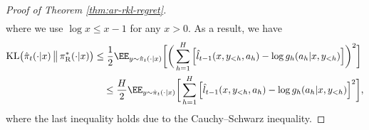 \documentclass[11pt]{article}
\newcommand{\KL}{\text{KL}}
\newcommand{\pir}{\pi_{\mathrm{R}}}
\begin{document}
\begin{proof}[Proof of Theorem \ref{thm:ar-rkl-regret}]
\begin{align*}
        \end{align*}
where we use $\log x \le x - 1$ for any $x > 0$.  
As a result, we have
\begin{align}
    \KL\bigl(
        \hat\pi_t(\cdot|x)
        \,\big\|\,
        \pir^*(\cdot|x)
    \bigr)&\leq
    \frac12
    \EE_{y\sim\hat\pi_t(\cdot|x)}
    \bigg[
        \bigg(
            \sum_{h=1}^H
            \Big[
                \hat l_{t-1}(x,y_{<h},a_h)
                -
                \log g_h(a_h|x,y_{<h})
            \Big]
        \bigg)^2
    \bigg]\notag\\
    &\quad\leq
    \frac H2
    \EE_{y\sim\hat\pi_t(\cdot|x)}
    \bigg[
        \sum_{h=1}^H
        \Big[
            \hat l_{t-1}(x,y_{<h},a_h)
            -
            \log g_h(a_h|x,y_{<h})
        \Big]^2
    \bigg],
    \label{eq:rkl-proof-kl-token-error}
\end{align}
where the last inequality holds due to the Cauchy--Schwarz inequality. 


\end{proof}
\end{document}
